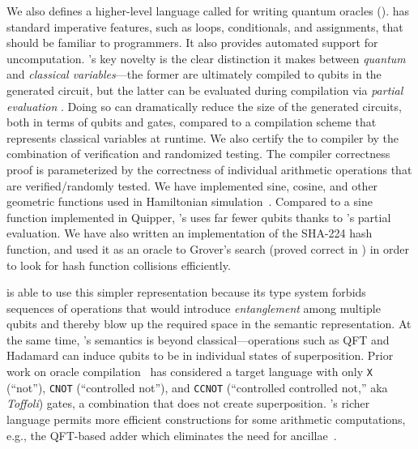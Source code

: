{We also defines a higher-level language called \vqimp for writing
quantum oracles (). \vqimp has standard imperative features, such as
loops, conditionals, and assignments, that should be familiar to
programmers. It also provides automated support for
uncomputation. \vqimp's key novelty is the clear distinction it makes
between \emph{quantum} and \emph{classical variables}---the former are
ultimately compiled to qubits in the generated circuit, but the latter
can be evaluated during compilation via \emph{partial evaluation} \cite{partialeval}. Doing so
can dramatically reduce the size of the generated circuits, both in
terms of qubits and gates, compared to a compilation scheme that
represents classical variables at runtime.
We also certify the \vqimp to \vqir compiler by the combination of verification and randomized testing.
The compiler correctness proof is parameterized by the correctness of individual arithmetic operations that are verified/randomly tested.
We have implemented sine, cosine, and
other geometric functions used in Hamiltonian simulation~\cite{feynman1982simulating}. 
 Compared to a sine function implemented in Quipper, \name's uses far fewer qubits 
 thanks to \vqimp's partial evaluation. 
We have also written an implementation of the SHA-224 hash
function, and used it as an oracle to Grover's search (proved correct
in \sqir) in order to look for hash function collisions
efficiently.

\oqasm is able to use this simpler representation because its
type system forbids sequences of operations that would introduce \emph{entanglement} among
multiple qubits and thereby blow up the required space in the semantic representation. 
%
At the same time, \oqasm's semantics is beyond 
classical---operations such as QFT and Hadamard can induce qubits to
be in individual states of superposition. Prior work on oracle
compilation~\cite{scaffCCnew,reverC,Green2013,Rand2018ReQWIRERA} has
considered a target language with only \texttt{X} (``not''),
\texttt{CNOT} (``controlled not''), and \texttt{CCNOT} (``controlled
controlled not,'' aka \emph{Toffoli}) gates, a combination that does
not create superposition. \oqasm's richer language permits more efficient constructions for some
arithmetic computations, e.g., the QFT-based adder which 
eliminates the need for ancillae~\cite{qft-adder}. 

}
